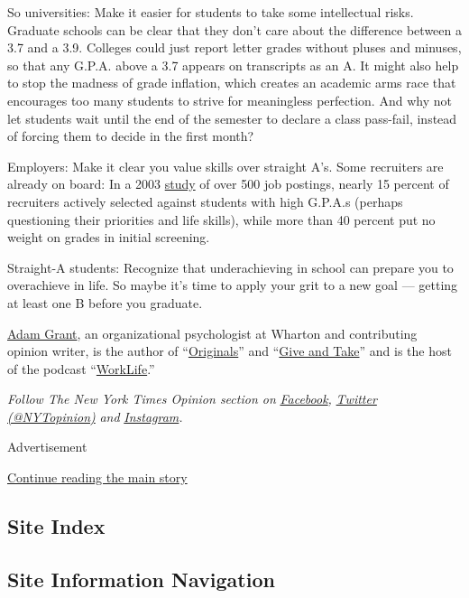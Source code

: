 So universities: Make it easier for students to take some intellectual
risks. Graduate schools can be clear that they don't care about the
difference between a 3.7 and a 3.9. Colleges could just report letter
grades without pluses and minuses, so that any G.P.A. above a 3.7
appears on transcripts as an A. It might also help to stop the madness
of grade inflation, which creates an academic arms race that encourages
too many students to strive for meaningless perfection. And why not let
students wait until the end of the semester to declare a class
pass-fail, instead of forcing them to decide in the first month?

Employers: Make it clear you value skills over straight A's. Some
recruiters are already on board: In a 2003
\href{https://onlinelibrary.wiley.com/doi/abs/10.1111/j.1744-6570.2003.tb00241.x}{study}
of over 500 job postings, nearly 15 percent of recruiters actively
selected against students with high G.P.A.s (perhaps questioning their
priorities and life skills), while more than 40 percent put no weight on
grades in initial screening.

Straight-A students: Recognize that underachieving in school can prepare
you to overachieve in life. So maybe it's time to apply your grit to a
new goal --- getting at least one B before you graduate.

\href{https://www.theatlantic.com/author/adam-grant/}{Adam Grant}, an
organizational psychologist at Wharton and contributing opinion writer,
is the author of
``\href{http://www.adamgrant.net/originals}{Originals}'' and
``\href{http://www.adamgrant.net/give-and-take}{Give and Take}'' and is
the host of the podcast
``\href{http://www.applepodcasts.com/worklife}{WorkLife}.''

\emph{Follow The New York Times Opinion section on}
\href{https://www.facebookcorewwwi.onion/nytopinion}{\emph{Facebook}}\emph{,}
\href{http://twitter.com/NYTOpinion}{\emph{Twitter (@NYTopinion)}}
\emph{and}
\href{https://www.instagram.com/nytopinion/}{\emph{Instagram}}\emph{.}

Advertisement

\protect\hyperlink{after-bottom}{Continue reading the main story}

\hypertarget{site-index}{%
\subsection{Site Index}\label{site-index}}

\hypertarget{site-information-navigation}{%
\subsection{Site Information
Navigation}\label{site-information-navigation}}

